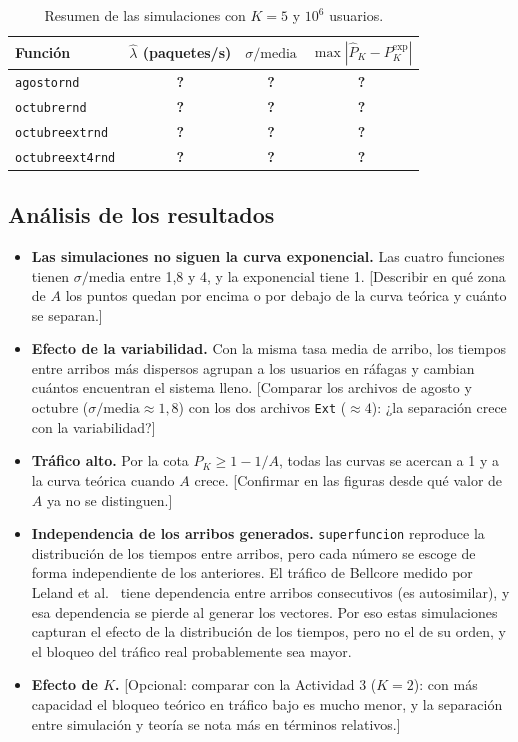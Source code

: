 \documentclass[12pt]{article}
\begin{document}
\begin{table}[!htbp]
\centering
\begin{tabular}{l c c c}
\hline
Función & $\hat{\lambda}$ (paquetes/s) & $\sigma/\text{media}$ & $\max\left|\hat{P}_K-P_K^{\text{exp}}\right|$ \\
\hline
\texttt{agostornd}      & \textbf{?} & \textbf{?} & \textbf{?} \\
\texttt{octubrernd}     & \textbf{?} & \textbf{?} & \textbf{?} \\
\texttt{octubreextrnd}  & \textbf{?} & \textbf{?} & \textbf{?} \\
\texttt{octubreext4rnd} & \textbf{?} & \textbf{?} & \textbf{?} \\
\hline
\end{tabular}
\caption{Resumen de las simulaciones con $K=5$ y $10^6$ usuarios.}
\label{tab:a5resumen}
\end{table}
 
\subsection{Análisis de los resultados}
\begin{itemize}
    \item \textbf{Las simulaciones no siguen la curva exponencial.} Las cuatro funciones tienen $\sigma/\text{media}$ entre 1,8 y 4, y la exponencial tiene 1. [Describir en qué zona de $A$ los puntos quedan por encima o por debajo de la curva teórica y cuánto se separan.]
    \item \textbf{Efecto de la variabilidad.} Con la misma tasa media de arribo, los tiempos entre arribos más dispersos agrupan a los usuarios en ráfagas y cambian cuántos encuentran el sistema lleno. [Comparar los archivos de agosto y octubre ($\sigma/\text{media}\approx 1{,}8$) con los dos archivos \texttt{Ext} ($\approx 4$): ¿la separación crece con la variabilidad?]
    \item \textbf{Tráfico alto.} Por la cota $P_K\geq 1-1/A$, todas las curvas se acercan a 1 y a la curva teórica cuando $A$ crece. [Confirmar en las figuras desde qué valor de $A$ ya no se distinguen.]
    \item \textbf{Independencia de los arribos generados.} \texttt{superfuncion} reproduce la distribución de los tiempos entre arribos, pero cada número se escoge de forma independiente de los anteriores. El tráfico de Bellcore medido por Leland et al.~\autocite{leland1994} tiene dependencia entre arribos consecutivos (es autosimilar), y esa dependencia se pierde al generar los vectores. Por eso estas simulaciones capturan el efecto de la distribución de los tiempos, pero no el de su orden, y el bloqueo del tráfico real probablemente sea mayor.
    \item \textbf{Efecto de $K$.} [Opcional: comparar con la Actividad 3 ($K=2$): con más capacidad el bloqueo teórico en tráfico bajo es mucho menor, y la separación entre simulación y teoría se nota más en términos relativos.]
\end{itemize}
 
\end{document}
